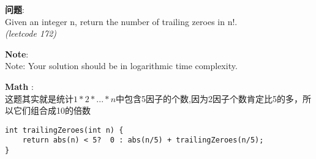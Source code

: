     
\begin{description}
    \item{\textbf{问题}}:\\
Given an integer n, return the number of trailing zeroes in n!. \\
\textit{(leetcode 172)}
    \item{\textbf{Note}}:\\
Note: Your solution should be in logarithmic time complexity.
    \item{\textbf{Math}} : 
    \\这题其实就是统计$1*2*...*n$中包含5因子的个数,因为2因子个数肯定比5的多，所以它们组合成10的倍数
    \begin{lstlisting}
int trailingZeroes(int n) {
	return abs(n) < 5?  0 : abs(n/5) + trailingZeroes(n/5);
}
    \end{lstlisting}
\end{description}
